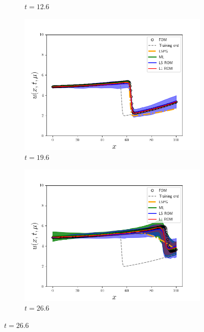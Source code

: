 \documentclass[3p,computermodern,10pt]{elsarticle}
\begin{document}
\begin{figure}
\begin{center}
\begin{subfigure}[t]{0.24\textwidth}
\caption{$t=12.6$}
\end{subfigure}
\begin{subfigure}[t]{0.24\textwidth}
\includegraphics[trim={0cm 0cm 0cm 0cm},clip,width=1.0\linewidth]{code/burgers/synapse_models/basis_study/results/figures/uquartiles_mu1_3_mu2_3_t_0280.png} 
\caption{$t=19.6$}
\end{subfigure}
\begin{subfigure}[t]{0.24\textwidth}
\includegraphics[trim={0cm 0cm 0cm 0cm},clip,width=1.0\linewidth]{code/burgers/synapse_models/basis_study/results/figures/uquartiles_mu1_3_mu2_3_t_0380.png} 
\caption{$t=26.6$}
\end{subfigure}


\end{center}
\end{figure}
\end{document}

